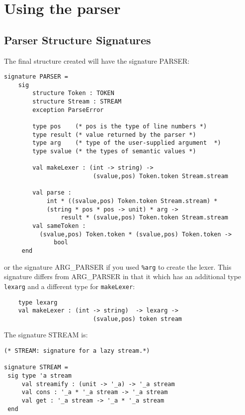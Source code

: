 \documentclass{article}
\begin{document}
\section{Using the parser}
\subsection{Parser Structure Signatures}
The final structure created will have the signature PARSER:
\begin{tt}
\begin{verbatim}
signature PARSER =
    sig
        structure Token : TOKEN
        structure Stream : STREAM
        exception ParseError

        type pos    (* pos is the type of line numbers *)
        type result (* value returned by the parser *)
        type arg    (* type of the user-supplied argument  *)
        type svalue (* the types of semantic values *)

        val makeLexer : (int -> string) ->
                         (svalue,pos) Token.token Stream.stream

        val parse :
            int * ((svalue,pos) Token.token Stream.stream) *
            (string * pos * pos -> unit) * arg ->
                result * (svalue,pos) Token.token Stream.stream
        val sameToken :
          (svalue,pos) Token.token * (svalue,pos) Token.token ->
              bool
     end
\end{verbatim}
\end{tt}
or the signature ARG\_PARSER if you used {\tt \%arg} to create the lexer.
This signature differs from ARG\_PARSER in that it
which has an additional type {\tt lexarg} and a different type
for {\tt makeLexer}:
\begin{tt}
\begin{verbatim}
    type lexarg
    val makeLexer : (int -> string)  -> lexarg ->
                         (svalue,pos) token stream
\end{verbatim}
\end{tt}

The signature STREAM is:
\begin{tt}
\begin{verbatim}
(* STREAM: signature for a lazy stream.*)

signature STREAM =
 sig type 'a stream
     val streamify : (unit -> '_a) -> '_a stream
     val cons : '_a * '_a stream -> '_a stream
     val get : '_a stream -> '_a * '_a stream
 end
\end{verbatim}
\end{tt}
\end{document}

